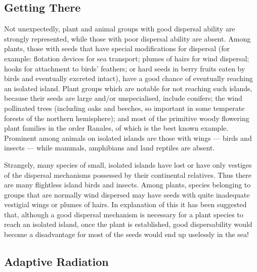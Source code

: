 \subsection{Getting There}

Not unexpectedly, plant and animal groups with good dispersal ability are strongly represented, while those with poor dispersal ability are absent.
Among plants, those with seeds that have special modifications for dispersal (for example: flotation devices for sea transport; plumes of hairs for wind dispersal; hooks for attachment to birds' feathers; or hard seeds in berry fruits eaten by birds and eventually excreted intact), have a good chance of eventually reaching an isolated island.
Plant groups which are notable for not reaching such islands, because their seeds are large and/or unspecialised, include conifers; the wind pollinated trees (including oaks and beeches, so important in some temperate forests of the northern hemisphere); and most of the primitive woody flowering plant families in the order Ranales, of which  is the best known example.
Prominent among animals on isolated islands are those with wings --- birds and insects --- while mammals, amphibians and land reptiles are absent.

Strangely, many species of small, isolated islands have lost or have only vestiges of the dispersal mechanisms possessed by their continental relatives.
Thus there are many flightless island birds and insects.
Among plants, species belonging to groups that are normally wind dispersed may have seeds with quite inadequate vestigial wings or plumes of hairs.
In explanation of this it has been suggested that, although a good dispersal mechanism is necessary for a plant species to reach an isolated island, once the plant is established, good dispersability would become a disadvantage for most of the seeds would end up uselessly in the sea!

\subsection{Adaptive Radiation}

